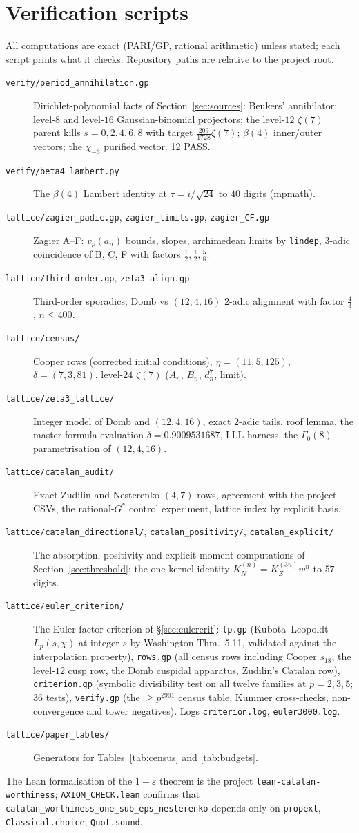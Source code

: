 \appendix
\section{Verification scripts}\label{app:scripts}
All computations are exact (PARI/GP, rational arithmetic) unless stated; each script prints what it checks. Repository paths are relative to the project root.
\begin{description}
\item[\texttt{verify/period\_annihilation.gp}] Dirichlet-polynomial facts of Section~\ref{sec:sources}: Beukers' annihilator; level-$8$ and level-$16$ Gaussian-binomial projectors; the level-$12$ $\zeta(7)$ parent kills $s=0,2,4,6,8$ with target $\tfrac{209}{1728}\zeta(7)$; $\beta(4)$ inner/outer vectors; the $\chi_{-3}$ purified vector. 12 PASS.
\item[\texttt{verify/beta4\_lambert.py}] The $\beta(4)$ Lambert identity at $\tau=i/\sqrt{24}$ to $40$ digits (mpmath).
\item[\texttt{lattice/zagier\_padic.gp}, \texttt{zagier\_limits.gp}, \texttt{zagier\_CF.gp}] Zagier A--F: $v_p(a_n)$ bounds, slopes, archimedean limits by \texttt{lindep}, $3$-adic coincidence of B, C, F with factors $\tfrac12,\tfrac12,\tfrac58$.
\item[\texttt{lattice/third\_order.gp}, \texttt{zeta3\_align.gp}] Third-order sporadics; Domb vs $(12,4,16)$ $2$-adic alignment with factor $\tfrac43$, $n\le400$.
\item[\texttt{lattice/census/}] Cooper rows (corrected initial conditions), $\eta=(11,5,125)$, $\delta=(7,3,81)$, level-$24$ $\zeta(7)$ ($A_n$, $B_n$, $d_n^7$, limit).
\item[\texttt{lattice/zeta3\_lattice/}] Integer model of Domb and $(12,4,16)$, exact $2$-adic tails, roof lemma, the master-formula evaluation $\delta=0.9009531687$, LLL harness, the $\Gamma_0(8)$ parametrisation of $(12,4,16)$.
\item[\texttt{lattice/catalan\_audit/}] Exact Zudilin and Nesterenko $(4,7)$ rows, agreement with the project CSVs, the rational-$G^*$ control experiment, lattice index by explicit basis.
\item[\texttt{lattice/catalan\_directional/}, \texttt{catalan\_positivity/}, \texttt{catalan\_explicit/}] The absorption, positivity and explicit-moment computations of Section~\ref{sec:threshold}; the one-kernel identity $K^{(n)}_N=K^{(3n)}_Zw^n$ to $57$ digits.
\item[\texttt{lattice/euler\_criterion/}] The Euler-factor criterion of \S\ref{sec:eulercrit}: \texttt{lp.gp} (Kubota--Leopoldt $L_p(s,\chi)$ at integer $s$ by Washington Thm.~5.11, validated against the interpolation property), \texttt{rows.gp} (all census rows including Cooper $s_{18}$, the level-$12$ cusp row, the Domb cuspidal apparatus, Zudilin's Catalan row), \texttt{criterion.gp} (symbolic divisibility test on all twelve families at $p=2,3,5$; 36 tests), \texttt{verify.gp} (the $\ge p^{2991}$ census table, Kummer cross-checks, non-convergence and tower negatives).  Logs \texttt{criterion.log}, \texttt{euler3000.log}.
\item[\texttt{lattice/paper\_tables/}] Generators for Tables~\ref{tab:census} and \ref{tab:budgets}.
\end{description}
The Lean formalisation of the $1-\varepsilon$ theorem is the project \texttt{lean-catalan-worthiness}; \texttt{AXIOM\_CHECK.lean} confirms that \texttt{catalan\_worthiness\_one\_sub\_eps\_nesterenko} depends only on \texttt{propext}, \texttt{Classical.choice}, \texttt{Quot.sound}.
